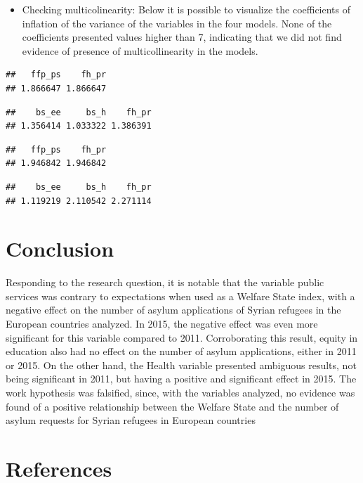 \documentclass[]{elsarticle} %
\providecommand{\tightlist}{%
  \setlength{\itemsep}{0pt}\setlength{\parskip}{0pt}}
\begin{document}
\begin{itemize}
\tightlist
\item
  Checking multicolinearity: Below it is possible to visualize the
  coefficients of inflation of the variance of the variables in the four
  models. None of the coefficients presented values higher than 7,
  indicating that we did not find evidence of presence of
  multicollinearity in the models.
\end{itemize}

\begin{verbatim}
##   ffp_ps    fh_pr 
## 1.866647 1.866647
\end{verbatim}

\begin{verbatim}
##    bs_ee     bs_h    fh_pr 
## 1.356414 1.033322 1.386391
\end{verbatim}

\begin{verbatim}
##   ffp_ps    fh_pr 
## 1.946842 1.946842
\end{verbatim}

\begin{verbatim}
##    bs_ee     bs_h    fh_pr 
## 1.119219 2.110542 2.271114
\end{verbatim}

\section{Conclusion}\label{conclusion}

Responding to the research question, it is notable that the variable
public services was contrary to expectations when used as a Welfare
State index, with a negative effect on the number of asylum applications
of Syrian refugees in the European countries analyzed. In 2015, the
negative effect was even more significant for this variable compared to
2011. Corroborating this result, equity in education also had no effect
on the number of asylum applications, either in 2011 or 2015. On the
other hand, the Health variable presented ambiguous results, not being
significant in 2011, but having a positive and significant effect in
2015. The work hypothesis was falsified, since, with the variables
analyzed, no evidence was found of a positive relationship between the
Welfare State and the number of asylum requests for Syrian refugees in
European countries

\section*{References}\label{references}
\end{document}
